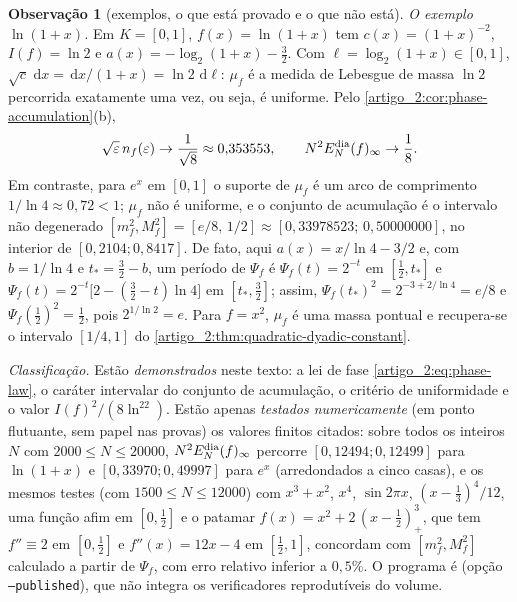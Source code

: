 \documentclass[12pt,a4paper]{article}
\theoremstyle{preciso}
\theoremstyle{definition}
\newcommand{\dd}{\,\mathrm{d}}
\theoremstyle{preciso}
\theoremstyle{preciso}
\theoremstyle{preciso}
\theoremstyle{preciso}
\theoremstyle{definition}
\theoremstyle{preciso}
\theoremstyle{definition}
\newtheorem{remark}[teorema]{Observação}
\theoremstyle{preciso}
\theoremstyle{preciso}
\theoremstyle{definition}
\begin{document}
\begin{remark}[exemplos, o que está provado e o que não está]\label{map:artigo_2:12.9}
\label{artigo_2:rem:phase-examples}
\emph{O exemplo $\ln(1+x)$.} Em $K=[0,1]$, $f(x)=\ln(1+x)$ tem
$c(x)=(1+x)^{-2}$, $I(f)=\ln2$ e $a(x)=-\log_2(1+x)-\tfrac32$. Com
$\ell=\log_2(1+x)\in[0,1]$, $\sqrt{c}\,\dd x=\dd x/(1+x)=\ln2\,\dd\ell$:
$\mu_f$ é a medida de Lebesgue de massa $\ln2$ percorrida exatamente uma vez,
ou seja, é uniforme. Pelo \cref{artigo_2:cor:phase-accumulation}(b),
\[
 \sqrt\varepsilon\,n_f(\varepsilon)\to\frac1{\sqrt8}\approx0{,}353553,
 \qquad
 N^2E_N^{\rm dia}(f)_\infty\to\frac18 .
\]
Em contraste, para $e^x$ em $[0,1]$ o suporte de $\mu_f$ é um arco de
comprimento $1/\ln4\approx0{,}72<1$; $\mu_f$ não é uniforme, e o conjunto de
acumulação é o intervalo não degenerado $[m_f^2,M_f^2]=[e/8,\,1/2]\approx[0{,}33978523;\,0{,}50000000]$,
no interior de $[0{,}2104;0{,}8417]$. De fato, aqui $a(x)=x/\ln4-3/2$ e, com
$b=1/\ln4$ e $t_*=\tfrac32-b$, um período de $\Psi_f$ é
$\Psi_f(t)=2^{-t}$ em $[\tfrac12,t_*]$ e
$\Psi_f(t)=2^{-t}\bigl[2-(\tfrac32-t)\ln4\bigr]$ em $[t_*,\tfrac32]$; assim,
$\Psi_f(t_*)^2=2^{-3+2/\ln4}=e/8$ e $\Psi_f(\tfrac12)^2=\tfrac12$, pois $2^{1/\ln2}=e$.
Para $f=x^2$, $\mu_f$ é uma massa pontual e recupera-se o intervalo $[1/4,1]$ do
\cref{artigo_2:thm:quadratic-dyadic-constant}.

\emph{Classificação.} Estão \emph{demonstrados} neste texto: a lei de fase
\eqref{artigo_2:eq:phase-law}, o caráter intervalar do conjunto de acumulação, o
critério de uniformidade e o valor $I(f)^2/(8\ln^22)$. Estão apenas
\emph{testados numericamente} (em ponto flutuante, sem papel nas provas) os
valores finitos citados: sobre todos os inteiros $N$ com $2000\le N\le20000$,
$N^2E_N^{\rm dia}(f)_\infty$ percorre $[0{,}12494;0{,}12499]$ para $\ln(1+x)$ e
$[0{,}33970;0{,}49997]$ para $e^x$ (arredondados a cinco casas), e os mesmos testes (com $1500\le N\le12000$) com $x^3+x^2$, $x^4$, $\sin2\pi x$, $(x-\tfrac13)^4/12$,
uma função afim em $[0,\tfrac12]$ e o patamar $f(x)=x^2+2\,(x-\tfrac12)_+^3$,
que tem $f''\equiv2$ em $[0,\tfrac12]$ e $f''(x)=12x-4$ em $[\tfrac12,1]$, concordam
com $[m_f^2,M_f^2]$ calculado a partir de $\Psi_f$, com erro relativo inferior a $0{,}5\%$.
O programa é  (opção \texttt{--published}), que não integra os
verificadores reprodutíveis do volume.


\end{remark}
\end{document}
